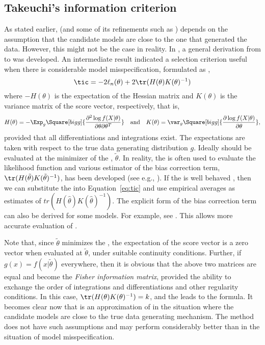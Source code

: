 \subsection{Takeuchi's information criterion}
\label{sub:Takeuchi's information criterion}

As stated earlier, \aic (and some of its refinements such as \aicc) depends on the assumption that the candidate models are close to the one that generated the data. However, this might not be the case in reality. In \cite{Takeuchi:1976vx}, a general derivation from \kld to \aic was developed. An intermediate result indicated a selection criterion useful when there is considerable model misspecification, formulated as \tic,
\begin{equation}
  \tic = -2\ell_n(\theta) + 2\tr(H(\theta)K(\theta)^{-1})
  \label{eq:tic}
\end{equation}
where $-H(\theta)$ is the expectation of the Hessian matrix and $K(\theta)$ is the variance matrix of the score vector, respectively, that is,
\begin{equation}
  H(\theta) = -\Exp_g\Square[bigg]{
    \frac{\partial^2\log f(X|\theta)}{\partial\theta\partial\theta^T}
  }\quad\text{and}\quad
  K(\theta) = \var_g\Square[bigg]{
    \frac{\partial\log f(X|\theta)}{\partial\theta}
  },
\end{equation}
provided that all differentiations and integrations exist. The expectations are taken with respect to the true data generating distribution $g$. Ideally \tic should be evaluated at the minimizer of the \kld, $\tilde\theta$. In reality, the \mle is often used to evaluate the likelihood function and various estimator of the bias correction term, $\tr(H(\tilde\theta)K(\tilde\theta)^{-1})$, has been developed (see e.g., \cite{Claeskens:2008tq}). If the \mle is well behaved \cite{Lehmann:1983vx}, then we can substitute the \mle into Equation~\eqref{eq:tic} and use empirical averages as estimates of $tr(H(\hat\theta)K(\hat\theta)^{-1})$. The explicit form of the bias correction term can also be derived for some models. For example, see \cite[][sec.~6.6]{Burnham:2002wc}. This allows more accurate evaluation of \tic.

Note that, since $\tilde\theta$ minimizes the \kld, the expectation of the score vector is a zero vector when evaluated at $\tilde\theta$, under suitable continuity conditions. Further, if $g(x) = f(x|\tilde\theta)$ everywhere, then it is obvious that the above two matrices are equal and become the \emph{Fisher information matrix}, provided the ability to exchange the order of integrations and differentiations and other regularity conditions. In this case, $\tr(H(\theta)K(\theta)^{-1}) = k$, and the \tic leads to the \aic formula. It becomes clear now that \aic is an approximation of \tic in the situation where the candidate models are close to the true data generating mechanism. The \tic method does not have such assumptions and may perform considerably better than \aic in the situation of model misspecification.

